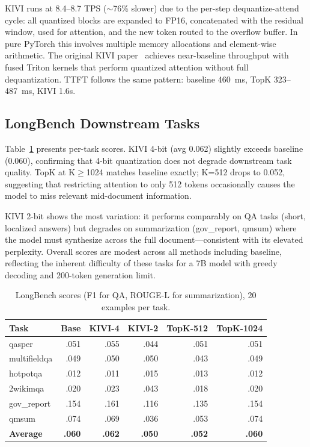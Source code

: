 \documentclass[conference]{IEEEtran}
\begin{document}
KIVI runs at 8.4--8.7 TPS ($\sim$76\% slower) due to the per-step dequantize-attend cycle: all quantized blocks are expanded to FP16, concatenated with the residual window, used for attention, and the new token routed to the overflow buffer. In pure PyTorch this involves multiple memory allocations and element-wise arithmetic. The original KIVI paper~\cite{kivi} achieves near-baseline throughput with fused Triton kernels that perform quantized attention without full dequantization. TTFT follows the same pattern: baseline 460~ms, TopK 323--487~ms, KIVI 1.6s.

\subsection{LongBench Downstream Tasks}

Table~\ref{tab:longbench} presents per-task scores. KIVI 4-bit (avg 0.062) slightly exceeds baseline (0.060), confirming that 4-bit quantization does not degrade downstream task quality. TopK at K$\geq$1024 matches baseline exactly; K=512 drops to 0.052, suggesting that restricting attention to only 512 tokens occasionally causes the model to miss relevant mid-document information.

KIVI 2-bit shows the most variation: it performs comparably on QA tasks (short, localized answers) but degrades on summarization (gov\_report, qmsum) where the model must synthesize across the full document---consistent with its elevated perplexity. Overall scores are modest across all methods including baseline, reflecting the inherent difficulty of these tasks for a 7B model with greedy decoding and 200-token generation limit.

\begin{table}[t]
\centering
\caption{LongBench scores (F1 for QA, ROUGE-L for summarization), 20 examples per task.}
\label{tab:longbench}
\begin{tabular}{@{}lrrrrr@{}}
\toprule
\textbf{Task} & \textbf{Base} & \textbf{KIVI-4} & \textbf{KIVI-2} & \textbf{TopK-512} & \textbf{TopK-1024} \\
\midrule
qasper & .051 & .055 & .044 & .051 & .051 \\
multifieldqa & .049 & .050 & .050 & .043 & .049 \\
hotpotqa & .012 & .011 & .015 & .013 & .012 \\
2wikimqa & .020 & .023 & .043 & .018 & .020 \\
gov\_report & .154 & .161 & .116 & .135 & .154 \\
qmsum & .074 & .069 & .036 & .053 & .074 \\
\midrule
\textbf{Average} & \textbf{.060} & \textbf{.062} & \textbf{.050} & \textbf{.052} & \textbf{.060} \\
\bottomrule
\end{tabular}
\end{table}
\end{document}
